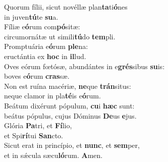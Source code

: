 \oddverse Quorum fílii, sicut novéllæ plan\textbf{ta}ti\textbf{ó}nes~\*\\
\oddverse in juven\textbf{tú}te \textbf{su}a.\\
\evenverse Fíliæ e\textbf{ó}rum com\textbf{pó}sitæ:~\*\\
\evenverse circumornátæ ut simili\textbf{tú}do \textbf{tem}pli.\\
\oddverse Promptuária e\textbf{ó}rum \textbf{ple}na:~\*\\
\oddverse eructántia ex \textbf{hoc} in \textbf{il}lud.\\
\evenverse Oves eórum fœtósæ, abundántes in e\textbf{grés}sibus \textbf{su}is:~\*\\
\evenverse boves e\textbf{ó}rum \textbf{cras}sæ.\\
\oddverse Non est ruína macériæ, \textbf{ne}que \textbf{trán}situs:~\*\\
\oddverse neque clamor in pla\textbf{té}is e\textbf{ó}rum.\\
\evenverse Beátum dixérunt pópulum, \textbf{cu}i \textbf{hæc} sunt:~\*\\
\evenverse beátus pópulus, cujus Dóminus \textbf{De}us \textbf{e}jus.\\
\oddverse Glória \textbf{Pa}tri, et \textbf{Fí}lio,~\*\\
\oddverse et Spi\textbf{rí}tui \textbf{San}cto.\\
\evenverse Sicut erat in princípio, et \textbf{nunc}, et \textbf{sem}per,~\*\\
\evenverse et in sǽcula sæcu\textbf{ló}rum. \textbf{A}men.\\
